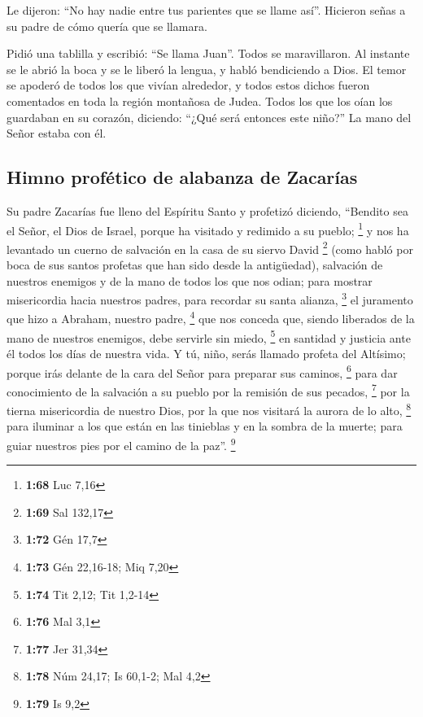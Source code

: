 \begin{paracol}{2}
 Le dijeron: ``No hay nadie entre tus parientes que se
llame así''.  Hicieron señas a su padre de cómo quería
que se llamara.

 Pidió una tablilla y escribió: ``Se llama Juan''. Todos
se maravillaron.  Al instante se le abrió la boca y se le
liberó la lengua, y habló bendiciendo a Dios.  El temor
se apoderó de todos los que vivían alrededor, y todos estos dichos
fueron comentados en toda la región montañosa de Judea. 
Todos los que los oían los guardaban en su corazón, diciendo: ``¿Qué
será entonces este niño?'' La mano del Señor estaba con él.

\hypertarget{himno-profuxe9tico-de-alabanza-de-zacaruxedas}{%
\subsection{Himno profético de alabanza de
Zacarías}\label{himno-profuxe9tico-de-alabanza-de-zacaruxedas}}

 Su padre Zacarías fue lleno del Espíritu Santo y
profetizó diciendo,  ``Bendito sea el Señor, el Dios de
Israel, porque ha visitado y redimido a su pueblo; \footnote{\textbf{1:68}
  Luc 7,16}  y nos ha levantado un cuerno de salvación en
la casa de su siervo David \footnote{\textbf{1:69} Sal 132,17}
 (como habló por boca de sus santos profetas que han sido
desde la antigüedad),  salvación de nuestros enemigos y
de la mano de todos los que nos odian;  para mostrar
misericordia hacia nuestros padres, para recordar su santa alianza,
\footnote{\textbf{1:72} Gén 17,7}  el juramento que hizo
a Abraham, nuestro padre, \footnote{\textbf{1:73} Gén 22,16-18; Miq 7,20}
 que nos conceda que, siendo liberados de la mano de
nuestros enemigos, debe servirle sin miedo, \footnote{\textbf{1:74} Tit
  2,12; Tit 1,2-14}  en santidad y justicia ante él todos
los días de nuestra vida.  Y tú, niño, serás llamado
profeta del Altísimo; porque irás delante de la cara del Señor para
preparar sus caminos, \footnote{\textbf{1:76} Mal 3,1} 
para dar conocimiento de la salvación a su pueblo por la remisión de sus
pecados, \footnote{\textbf{1:77} Jer 31,34}  por la
tierna misericordia de nuestro Dios, por la que nos visitará la aurora
de lo alto, \footnote{\textbf{1:78} Núm 24,17; Is 60,1-2; Mal 4,2}
 para iluminar a los que están en las tinieblas y en la
sombra de la muerte; para guiar nuestros pies por el camino de la paz''.
\footnote{\textbf{1:79} Is 9,2}


\end{paracol}
